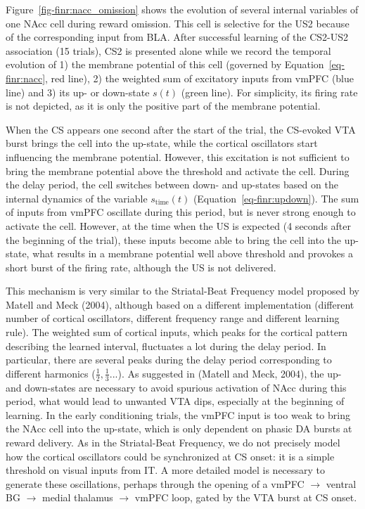 \documentclass[
  11pt,
  a4paper,
]{scrbook}
\begin{document}
Figure~\ref{fig-finr:nacc_omission} shows the evolution of several
internal variables of one NAcc cell during reward omission. This cell is
selective for the US2 because of the corresponding input from BLA. After
successful learning of the CS2-US2 association (15 trials), CS2 is
presented alone while we record the temporal evolution of 1) the
membrane potential of this cell (governed by
Equation~\ref{eq-finr:nacc}, red line), 2) the weighted sum of
excitatory inputs from vmPFC (blue line) and 3) its up- or down-state
\(s(t)\) (green line). For simplicity, its firing rate is not depicted,
as it is only the positive part of the membrane potential.

When the CS appears one second after the start of the trial, the
CS-evoked VTA burst brings the cell into the up-state, while the
cortical oscillators start influencing the membrane potential. However,
this excitation is not sufficient to bring the membrane potential above
the threshold and activate the cell. During the delay period, the cell
switches between down- and up-states based on the internal dynamics of
the variable \(s_{\text{time}}(t)\) (Equation~\ref{eq-finr:updown}). The
sum of inputs from vmPFC oscillate during this period, but is never
strong enough to activate the cell. However, at the time when the US is
expected (4 seconds after the beginning of the trial), these inputs
become able to bring the cell into the up-state, what results in a
membrane potential well above threshold and provokes a short burst of
the firing rate, although the US is not delivered.

This mechanism is very similar to the Striatal-Beat Frequency model
proposed by Matell and Meck (2004), although based on a different
implementation (different number of cortical oscillators, different
frequency range and different learning rule). The weighted sum of
cortical inputs, which peaks for the cortical pattern describing the
learned interval, fluctuates a lot during the delay period. In
particular, there are several peaks during the delay period
corresponding to different harmonics (\(\frac{1}{2}, \frac{1}{3}...\)).
As suggested in (Matell and Meck, 2004), the up- and down-states are
necessary to avoid spurious activation of NAcc during this period, what
would lead to unwanted VTA dips, especially at the beginning of
learning. In the early conditioning trials, the vmPFC input is too weak
to bring the NAcc cell into the up-state, which is only dependent on
phasic DA bursts at reward delivery. As in the Striatal-Beat Frequency,
we do not precisely model how the cortical oscillators could be
synchronized at CS onset: it is a simple threshold on visual inputs from
IT. A more detailed model is necessary to generate these oscillations,
perhaps through the opening of a vmPFC \(\rightarrow\) ventral BG
\(\rightarrow\) medial thalamus \(\rightarrow\) vmPFC loop, gated by the
VTA burst at CS onset.
\end{document}
